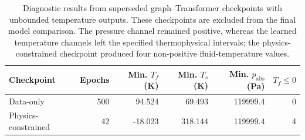 \begin{table}[htbp]
\centering
\scriptsize
\setlength{\tabcolsep}{3pt}
\caption{Diagnostic results from superseded graph--Transformer checkpoints with unbounded temperature outputs. These checkpoints are excluded from the final model comparison. The pressure channel remained positive, whereas the learned temperature channels left the specified thermophysical intervals; the physics-constrained checkpoint produced four non-positive fluid-temperature values.}
\label{tab:unbounded_output_diagnostic}
\begin{tabular}{@{}lrrrrr@{}}
\toprule
Checkpoint & Epochs & Min. $T_f$ (K) & Min. $T_s$ (K) & Min. $p_{\mathrm{abs}}$ (Pa) & $T_f\leq0$ \\
\midrule
Data-only & 500 & 94.524 & 69.493 & 119999.4 & 0 \\
Physics-constrained & 42 & -18.023 & 318.144 & 119999.4 & 4 \\
\bottomrule
\end{tabular}
\end{table}

